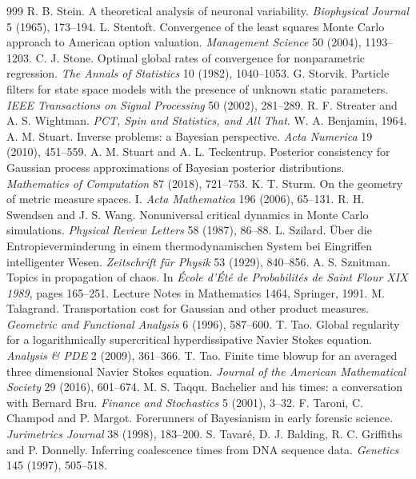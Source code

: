\begin{thebibliography}{999}
 R. B. Stein. A theoretical analysis of neuronal variability. \emph{Biophysical Journal} 5 (1965), 173--194.
 L. Stentoft. Convergence of the least squares Monte Carlo approach to American option valuation. \emph{Management Science} 50 (2004), 1193--1203.
 C. J. Stone. Optimal global rates of convergence for nonparametric regression. \emph{The Annals of Statistics} 10 (1982), 1040--1053.
 G. Storvik. Particle filters for state space models with the presence of unknown static parameters. \emph{IEEE Transactions on Signal Processing} 50 (2002), 281--289.
 R. F. Streater and A. S. Wightman. \emph{PCT, Spin and Statistics, and All That}. W. A. Benjamin, 1964.
 A. M. Stuart. Inverse problems: a Bayesian perspective. \emph{Acta Numerica} 19 (2010), 451--559.
 A. M. Stuart and A. L. Teckentrup. Posterior consistency for Gaussian process approximations of Bayesian posterior distributions. \emph{Mathematics of Computation} 87 (2018), 721--753.
 K. T. Sturm. On the geometry of metric measure spaces. I. \emph{Acta Mathematica} 196 (2006), 65--131.
 R. H. Swendsen and J. S. Wang. Nonuniversal critical dynamics in Monte Carlo simulations. \emph{Physical Review Letters} 58 (1987), 86--88.
 L. Szilard. \"Uber die Entropieverminderung in einem thermodynamischen System bei Eingriffen intelligenter Wesen. \emph{Zeitschrift f\"ur Physik} 53 (1929), 840--856.
 A. S. Sznitman. Topics in propagation of chaos. In \emph{\'Ecole d'\'Et\'e de Probabilit\'es de Saint Flour XIX 1989}, pages 165--251. Lecture Notes in Mathematics 1464, Springer, 1991.
 M. Talagrand. Transportation cost for Gaussian and other product measures. \emph{Geometric and Functional Analysis} 6 (1996), 587--600.
 T. Tao. Global regularity for a logarithmically supercritical hyperdissipative Navier Stokes equation. \emph{Analysis \& PDE} 2 (2009), 361--366.
 T. Tao. Finite time blowup for an averaged three dimensional Navier Stokes equation. \emph{Journal of the American Mathematical Society} 29 (2016), 601--674.
 M. S. Taqqu. Bachelier and his times: a conversation with Bernard Bru. \emph{Finance and Stochastics} 5 (2001), 3--32.
 F. Taroni, C. Champod and P. Margot. Forerunners of Bayesianism in early forensic science. \emph{Jurimetrics Journal} 38 (1998), 183--200.
 S. Tavar\'e, D. J. Balding, R. C. Griffiths and P. Donnelly. Inferring coalescence times from DNA sequence data. \emph{Genetics} 145 (1997), 505--518.

\end{thebibliography}
